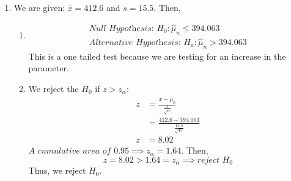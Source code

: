 \documentclass[13pt]{article}
\begin{document}
\begin{enumerate}[label=(\alph*)]
\item 
  We are given: $\overline{x} = 412.6$ and $s = 15.5$. Then,
  \begin{enumerate}[label=(\roman*)]
  \item
    \begin{align*}
      \textit{Null Hypothesis: } H_0: \hat{\mu}_n \leq 394.063 \\
      \textit{Alternative Hypothesis: } H_a: \hat{\mu}_n > 394.063
    \end{align*}
    This is a one tailed test because we are testing for an increase in the parameter.
  \item We reject the $H_0$ if $z > z_\alpha$:
    \begin{align*}
      z &= \frac{\overline{x} - \mu_0}{\frac{s}{\sqrt{n}}} \\
        &= \frac{412.6 - 394.063}{\frac{15.5}{\sqrt{45}}} \\
      z &= 8.02
    \end{align*}
    $\textit{A cumulative area of } 0.95 \implies z_\alpha = 1.64$. Then,
    \[z = 8.02 > 1.64 = z_\alpha \implies \textit{reject } H_0\]
    Thus, we reject $H_0$.
  \end{enumerate}
\end{enumerate}
\end{document}
